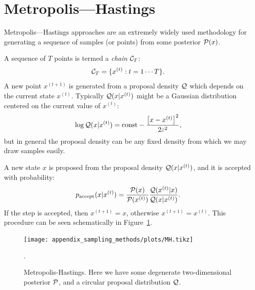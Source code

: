 \section{Metropolis---Hastings}
\label{sec:sm:mh}
Metropolis---Hastings approaches are an extremely widely used methodology for generating a sequence of samples (or points) from some posterior $\mathcal{P}(x)$.

A sequence of $T$ points is termed a {\em chain\/} $\mathcal{C}_T$:
\begin{equation}
  \mathcal{C}_T = \{ x^{(t)}: t=1\cdots T \}.
\end{equation}
A new point $x^{(t+1)}$ is generated from a proposal density $\mathcal{Q}$ which depends on the current state $x^{(t)}$. Typically $\mathcal{Q}(x|x^{(t)})$ might be a Gaussian distribution centered on the current value of $x^{(t)}$:
\begin{equation}
  \log \mathcal{Q}(x|x^{(t)}) = \text{const} -\frac{{\left[ x-x^{(t)} \right]}^2}{2\varepsilon^2},
\end{equation}
but in general the proposal density can be any fixed density from which we may draw samples easily.

A new state $x$ is proposed from the proposal density $\mathcal{Q}(x|x^{(t)})$, and it is accepted with probability:
\begin{equation}
  p_\mathrm{accept}(x|x^{(t)}) = \frac{\mathcal{P}(x)}{\mathcal{P}(x^{(t)})}\frac{\mathcal{Q}(x^{(t)}|x)}{\mathcal{Q}(x|x^{(t)})}.
\end{equation}
If the step is accepted, then $x^{(t+1)}=x$, otherwise $x^{(t+1)} = x^{(t)}$. This procedure can be seen schematically in Figure~\ref{fig:sm:MH}.
\begin{figure}[tp]
  \centering
  \texttt{[image: appendix\_sampling\_methods/plots/MH.tikz]}
  \caption{Metropolis-Hastings. Here we have some degenerate two-dimensional posterior $\mathcal{P}$, and a circular proposal distribution $\mathcal{Q}$.\label{fig:sm:MH}}.
\end{figure}


